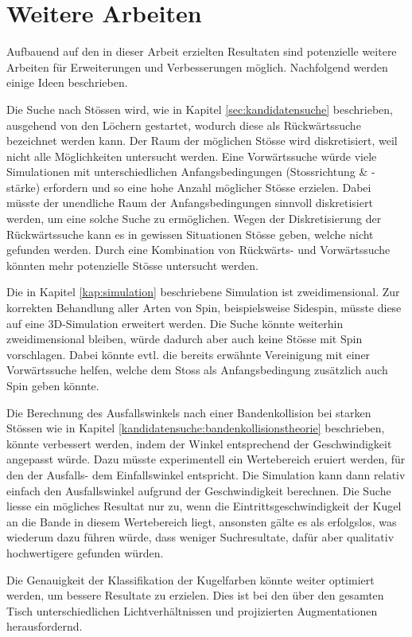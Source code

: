 \chapter{Weitere Arbeiten}\label{kap:weitere_arbeiten}
Aufbauend auf den in dieser Arbeit erzielten Resultaten sind potenzielle weitere Arbeiten für Erweiterungen und Verbesserungen
möglich.
Nachfolgend werden einige Ideen beschrieben.

Die Suche nach Stössen wird, wie in Kapitel \ref{sec:kandidatensuche} beschrieben, ausgehend von den Löchern gestartet,
wodurch diese als Rückwärtssuche bezeichnet werden kann.
Der Raum der möglichen Stösse wird diskretisiert, weil nicht alle Möglichkeiten untersucht werden.
Eine Vorwärtssuche würde viele Simulationen mit unterschiedlichen Anfangsbedingungen (Stossrichtung \& -stärke)
erfordern und so eine hohe Anzahl möglicher Stösse erzielen.
Dabei müsste der unendliche Raum der Anfangsbedingungen sinnvoll diskretisiert werden, um eine solche Suche zu ermöglichen.
Wegen der Diskretisierung der Rückwärtssuche kann es in gewissen Situationen Stösse geben, welche nicht gefunden werden.
Durch eine Kombination von Rückwärts- und Vorwärtssuche könnten mehr potenzielle Stösse untersucht werden.

Die in Kapitel \ref{kap:simulation} beschriebene Simulation ist zweidimensional.
Zur korrekten Behandlung aller Arten von Spin, beispielsweise Sidespin, müsste diese auf eine 3D-Simulation erweitert werden.
Die Suche könnte weiterhin zweidimensional bleiben, würde dadurch aber auch keine Stösse mit Spin vorschlagen.
Dabei könnte evtl. die bereits erwähnte Vereinigung mit einer Vorwärtssuche helfen, welche dem Stoss als
Anfangsbedingung zusätzlich auch Spin geben könnte.

Die Berechnung des Ausfallswinkels nach einer Bandenkollision bei starken Stössen wie in
Kapitel \ref{kandidatensuche:bandenkollisionstheorie} beschrieben, könnte verbessert werden, indem der Winkel entsprechend
der Geschwindigkeit angepasst würde. Dazu müsste experimentell ein Wertebereich eruiert werden, für den der Ausfalls- dem
Einfallswinkel entspricht. Die Simulation kann dann relativ einfach den Ausfallswinkel aufgrund der Geschwindigkeit
berechnen. Die Suche liesse ein mögliches Resultat nur zu, wenn die Eintrittsgeschwindigkeit der Kugel an die Bande
in diesem Wertebereich liegt, ansonsten gälte es als erfolgslos, was wiederum dazu führen würde,
dass weniger Suchresultate, dafür aber qualitativ hochwertigere gefunden würden.

Die Genauigkeit der Klassifikation der Kugelfarben könnte weiter optimiert werden, um bessere Resultate zu erzielen.
Dies ist bei den über den gesamten Tisch unterschiedlichen Lichtverhältnissen und projizierten Augmentationen herausfordernd.

